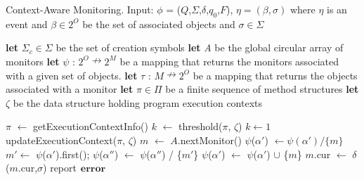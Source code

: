 \begin{algorithm}[t]
\caption[Algorithm]{Context-Aware Monitoring. Input: $\phi$ = 
($Q$,$\Sigma$,$\delta$,$q_{0}$,$F$), $\eta=(\beta, \sigma)$ where $\eta$ is an event and $\beta \in 2^O$ 
be the set of associated objects and $\sigma \in \Sigma$}          %
\label{alg1}                           %
\begin{algorithmic}[1]                  
   \STATE \textbf{let} $\Sigma_{c} \in \Sigma$ be the set of creation symbols
   \STATE \textbf{let} \textit{A} be the global circular array of monitors
    \STATE \textbf{let} $\psi$ : $2^O \nrightarrow 2^M$ be a mapping that returns the monitors associated with a given set of objects.
   \STATE \textbf{let} $\tau$ : $M \nrightarrow 2^O$ be a mapping that returns the objects associated with a monitor
   \STATE \textbf{let} $\pi \in \Pi$ be a finite sequence of method structures
   \STATE \textbf{let} $\zeta$ be the data structure holding program execution contexts
  
   
        \STATE $\pi$  $\leftarrow$ getExecutionContextInfo()
           \STATE $k$ $\leftarrow$ threshold($\pi$, $\zeta$)
        \ELSE
        	   \STATE $k \leftarrow 1$
        \ENDIF
        \STATE updateExecutionContext($\pi$, $\zeta$)
            	\STATE $m$ $\leftarrow$ $A$.nextMonitor()
		\STATE $\psi$($\alpha'$) $\leftarrow  \psi(\alpha') / \{m\}$
        		\ENDFOR
				 \STATE $m' \leftarrow$ $\psi$($\alpha'$).first();
					\STATE $\psi$($\alpha''$) $\leftarrow$  
$\psi$($\alpha''$) / \{$m'$\}
        				\ENDFOR
			\ENDIF
                		 \STATE $\psi$($\alpha'$) $\leftarrow$  
$\psi$($\alpha'$) $\cup$ \{$m$\}
        		\ENDFOR
        \ENDIF
 \ENDIF
     \STATE $m$.cur $\leftarrow$ $\delta$($m$.cur,$\sigma$)
        \STATE report$\hspace{5pt}\textbf{error}$
     \ENDIF
 \ENDFOR
 
\end{algorithmic}

\end{algorithm}
\label{algo:monitoring}



